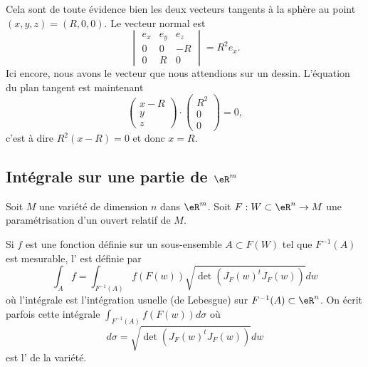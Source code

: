 \begin{example}
    Cela sont de toute évidence bien les deux vecteurs tangents à la sphère au point $(x,y,z)=(R,0,0)$. Le vecteur normal est
    \begin{equation}
        \begin{vmatrix}
            e_x    &   e_y    &   e_z    \\
            0    &   0    &   -R    \\
            0    &   R    &   0
        \end{vmatrix}=R^2e_x.
    \end{equation}
    Ici encore, nous avons le vecteur que nous attendions sur un dessin. L'équation du plan tangent est maintenant
    \begin{equation}
        \begin{pmatrix}
            x-R    \\
            y    \\
            z
        \end{pmatrix}\cdot
        \begin{pmatrix}
            R^2    \\
            0    \\
            0
        \end{pmatrix}=0,
    \end{equation}
    c'est à dire $R^2(x-R)=0$ et donc $x=R$.
\end{example}

\subsection{Intégrale sur une partie de \( \eR^m\)}

Soit $M$ une variété de dimension $n$ dans $\eR^m$. Soit $F : W \subset \eR^n \to M$ une paramétrisation d'un ouvert relatif de $M$.

Si $f$ est une fonction définie sur un sous-ensemble $A \subset F(W)$ tel que $F^{-1}(A)$ est mesurable, l' est définie par
\begin{equation*}
  \int_A f = \int_{F^{-1}(A)} f(F(w)) \sqrt{\det(J_F(w)^t {J_F(w)})} dw
\end{equation*}
où l'intégrale est l'intégration usuelle (de Lebesgue) sur $F^{-1}(A) \subset \eR^n$. On écrit parfois cette intégrale $\int_{F^{-1}(A)} f(F(w)) d\sigma$ où
\begin{equation}        \label{EQooARMAooQPhQAL}
  d\sigma = \sqrt{\det(J_F(w)^t {J_F(w)})} dw
\end{equation}
est l' de la variété.

